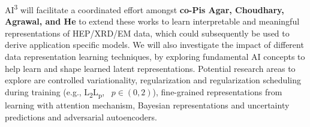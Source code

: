 AI\textsuperscript{3} will facilitate a coordinated effort amongst \textbf{co-Pis Agar, Choudhary, Agrawal, and He} to extend these works to learn interpretable and meaningful representations of HEP/XRD/EM data, which could subsequently be used to derive application specific models. We will also investigate the impact of different data representation learning techniques, by exploring fundamental AI concepts to help learn and shape learned latent representations. Potential research areas to explore are controlled variationality,  regularization and regularization scheduling during training (e.g., L\textsubscript{2}\xrightarrow{}L\textsubscript{p}, \ $p \in (0,2)$), fine-grained representations from learning with attention mechanism, Bayesian representations and uncertainty predictions  and adversarial autoencoders.   

 

    
    




 